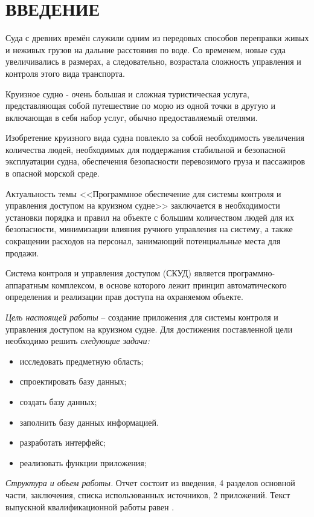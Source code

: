 \section*{ВВЕДЕНИЕ}
Суда с древних времён служили одним из передовых способов переправки живых и неживых грузов на дальние расстояния по воде. Со временем, новые суда увеличивались в размерах, а следовательно, возрастала сложность управления и контроля этого вида транспорта.

Круизное судно - очень большая и сложная туристическая услуга, представляющая собой путешествие по морю из одной точки в другую и включающая в себя набор услуг, обычно предоставляемый отелями.

Изобретение круизного вида судна повлекло за собой необходимость увеличения количества людей, необходимых для поддержания стабильной и безопасной эксплуатации судна, обеспечения безопасности перевозимого груза и пассажиров в опасной морской среде.

Актуальность темы <<Программное обеспечение для системы контроля и управления доступом на круизном судне>> заключается в необходимости установки порядка и правил на объекте с большим количеством людей для их безопасности, минимизации влияния ручного управления на систему, а также сокращении расходов на персонал, занимающий потенциальные места для продажи.

Система контроля и управления доступом (СКУД) является программно-аппаратным комплексом, в основе которого лежит принцип автоматического определения и реализации прав доступа на охраняемом объекте.

\emph{Цель настоящей работы} – создание приложения для системы контроля и управления доступом на круизном судне. Для достижения поставленной цели необходимо решить \emph{следующие задачи:}
\begin{itemize}
\item исследовать предметную область;
\item спроектировать базу данных;
\item создать базу данных;
\item заполнить базу данных информацией.
\item разработать  интерфейс;
\item реализовать функции приложения;
\end{itemize}

\emph{Структура и объем работы.} Отчет состоит из введения, 4 разделов основной части, заключения, списка использованных источников, 2 приложений. Текст выпускной квалификационной работы равен .

